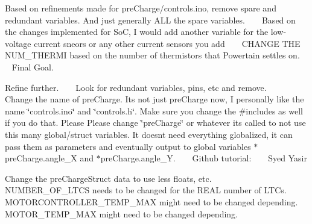 \begin{DoxyRefList}
\item[File \mbox{\hyperlink{_main_8h}{Main.h}} ]\label{todo__todo000007}%
%
 Based on refinements made for pre\+Charge/controls.\+ino, remove spare and redundant variables. And just generally ALL the spare variables. ~\newline
 ~\newline
 Based on the changes implemented for SoC, I would add another variable for the low-\/voltage current sneors or any other current sensors you add ~\newline
 ~\newline
 CHANGE THE NUM\+\_\+\+THERMI based on the number of thermistors that Powertain settles on. ~\newline
 ~\newline
 Final Goal.  
\item[File \mbox{\hyperlink{_main_8ino}{Main.ino}} ]\label{todo__todo000008}%
%
 Refine further. ~\newline
 ~\newline
 Look for redundant variables, pins, etc and remove. ~\newline
 ~\newline
 Change the name of pre\+Charge. It\textquotesingle{}s not just pre\+Charge now, I personally like the name \char`\"{}controls.\+ino\char`\"{} and \char`\"{}controls.\+h\char`\"{}. Make sure you change the \#includes as well if you do that. Please Please change \char`\"{}pre\+Charge\char`\"{} or whatever it\textquotesingle{}s called to not use this many global/struct variables. It doesn\textquotesingle{}t need everything globalized, it can pass them as parameters and eventually output to global variables $\ast$pre\+Charge.angle\+\_\+X and $\ast$pre\+Charge.angle\+\_\+Y. ~\newline
 ~\newline
 Github tutorial\+: ~\newline
 ~\newline
 Syed Yasir  
\item[File \mbox{\hyperlink{_precharge_8h}{Precharge.h}} ]\label{todo__todo000009}%
%
 Change the pre\+Charge\+Struct data to use less floats, etc. ~\newline
 ~\newline
 NUMBER\+\_\+\+OF\+\_\+\+LTCS needs to be changed for the REAL number of LTCs. MOTORCONTROLLER\+\_\+\+TEMP\+\_\+\+MAX might need to be changed depending. MOTOR\+\_\+\+TEMP\+\_\+\+MAX might need to be changed depending. ~\newline

\end{DoxyRefList}
